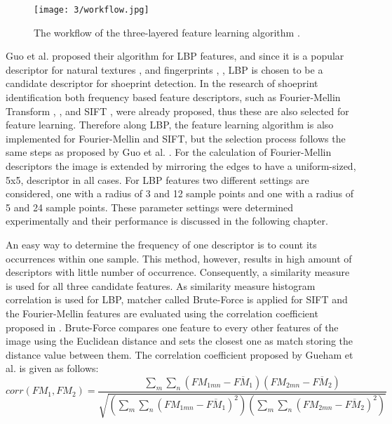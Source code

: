 \documentclass[draft,final]{vutinfth} %
\begin{document}
\begin{figure}[h]
  \centering
  \texttt{[image: 3/workflow.jpg]}
  \caption{The workflow of the three-layered feature learning algorithm  \cite{guo2012discriminative}.}
  \label{fig:pe:workflow} %
\end{figure}


\par
Guo et al. \cite{guo2012discriminative} proposed their algorithm for LBP features, and since it is a popular descriptor for natural textures \cite{hong2014combining}, \cite{ahonen2009rotation} and fingerprints \cite{wang2013pixel}, \cite{rida2018palmprint}, LBP is chosen to be a candidate descriptor for shoeprint detection.
In the research of shoeprint identification both frequency based feature descriptors, such as Fourier-Mellin Transform \cite{wu2019crime}, \cite{gueham2008automatic}, and SIFT \cite{nibouche2009rotation}, \cite{richetelli2017classification} were already proposed, thus these are also selected for feature learning.
Therefore along LBP, the feature learning algorithm is also implemented for Fourier-Mellin and SIFT, but the selection process follows the same steps as proposed by Guo et al. \cite{guo2012discriminative}.
For the calculation of Fourier-Mellin descriptors the image is extended by mirroring the edges to have a uniform-sized, 5x5, descriptor in all cases.
For LBP features two different settings are considered, one with a radius of 3 and 12 sample points and one with a radius of 5 and 24 sample points.
These parameter settings were determined experimentally and their performance is discussed in the following chapter.
\par
An easy way to determine the frequency of one descriptor is to count its occurrences within one sample.
This method, however, results in high amount of descriptors with little number of occurrence.
Consequently, a similarity measure is used for all three candidate features. 
As similarity measure histogram correlation is used for LBP, matcher called Brute-Force is applied for SIFT and the Fourier-Mellin features are evaluated using the correlation coefficient proposed  in \cite{gueham2008automatic}.
Brute-Force compares one feature to every other features of the image using the Euclidean distance and sets the closest one as match storing the distance value between them.
The correlation coefficient proposed by Gueham et al. \cite{gueham2008automatic} is given as follows:
\[ corr(FM_{1},FM_{2}) = \frac{\sum\limits_{m}\sum\limits_{n}(FM_{1mn}-\overline{FM_{1}})(FM_{2mn}-\overline{FM_{2}})}{\sqrt{(\sum\limits_{m}\sum\limits_{n}(FM_{1mn}-\overline{FM_{1}})^2)(\sum\limits_{m}\sum\limits_{n}(FM_{2mn}-\overline{FM_{2}})^2)}}  \]
\end{document}
